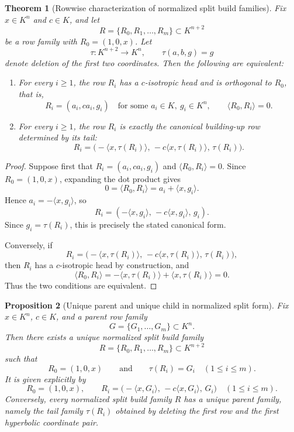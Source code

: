 \documentclass[12pt]{article}
\newtheorem{theorem}{Theorem}[section]
\newtheorem{prop}[theorem]{Proposition}
\begin{document}
\begin{theorem}[Rowwise characterization of normalized split build families]
\label{thm:split-rowwise-characterization}
Fix $x \in K^n$ and $c \in K$, and let
\[
R=\{R_0,R_1,\dots,R_m\}\subset K^{n+2}
\]
be a row family with $R_0=(1,0,x)$. Let
\[
\tau : K^{n+2}\to K^n,\qquad \tau(a,b,g)=g
\]
denote deletion of the first two coordinates. Then the following are equivalent:
\begin{enumerate}
\item For every $i\ge 1$, the row $R_i$ has a $c$-isotropic head and is orthogonal to $R_0$, that is,
\[
R_i=(a_i,c a_i,g_i)
\quad\text{for some } a_i\in K,\ g_i\in K^n,
\qquad
\langle R_0,R_i\rangle=0.
\]
\item For every $i\ge 1$, the row $R_i$ is exactly the canonical building-up row determined by its tail:
\[
R_i
=
\bigl(-\langle x,\tau(R_i)\rangle,\,-c\langle x,\tau(R_i)\rangle,\,\tau(R_i)\bigr).
\]
\end{enumerate}
\end{theorem}

\begin{proof}
Suppose first that $R_i=(a_i,c a_i,g_i)$ and $\langle R_0,R_i\rangle=0$. Since $R_0=(1,0,x)$, expanding the dot product gives
\[
0=\langle R_0,R_i\rangle = a_i+\langle x,g_i\rangle.
\]
Hence $a_i=-\langle x,g_i\rangle$, so
\[
R_i=(-\langle x,g_i\rangle,\,-c\langle x,g_i\rangle,\,g_i).
\]
Since $g_i=\tau(R_i)$, this is precisely the stated canonical form.

Conversely, if
\[
R_i=
\bigl(-\langle x,\tau(R_i)\rangle,\,-c\langle x,\tau(R_i)\rangle,\,\tau(R_i)\bigr),
\]
then $R_i$ has a $c$-isotropic head by construction, and
\[
\langle R_0,R_i\rangle
=
-\langle x,\tau(R_i)\rangle+\langle x,\tau(R_i)\rangle
=0.
\]
Thus the two conditions are equivalent.
\end{proof}

\begin{prop}[Unique parent and unique child in normalized split form]
\label{prop:split-parent-child-unique}
Fix $x\in K^n$, $c\in K$, and a parent row family
\[
G=\{G_1,\dots,G_m\}\subset K^n.
\]
Then there exists a unique normalized split build family
\[
R=\{R_0,R_1,\dots,R_m\}\subset K^{n+2}
\]
such that
\[
R_0=(1,0,x)
\qquad\text{and}\qquad
\tau(R_i)=G_i \quad (1\le i\le m).
\]
It is given explicitly by
\[
R_0=(1,0,x),
\qquad
R_i=\bigl(-\langle x,G_i\rangle,\,-c\langle x,G_i\rangle,\,G_i\bigr)
\quad (1\le i\le m).
\]
Conversely, every normalized split build family $R$ has a unique parent family, namely the tail family $\tau(R_i)$ obtained by deleting the first row and the first hyperbolic coordinate pair.
\end{prop}
\end{document}
